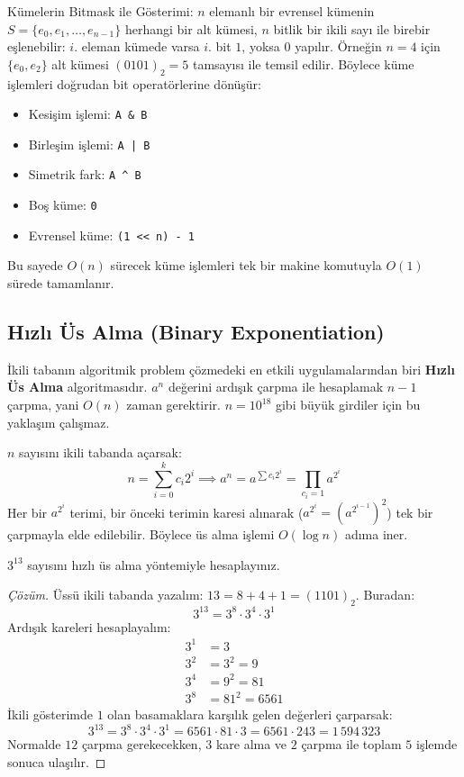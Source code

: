 Kümelerin Bitmask ile Gösterimi:
$n$ elemanlı bir evrensel kümenin $S = \{e_0, e_1, \dots, e_{n-1}\}$ herhangi bir alt kümesi, $n$ bitlik bir ikili sayı ile birebir eşlenebilir:
$i$. eleman kümede varsa $i$. bit $1$, yoksa $0$ yapılır.
Örneğin $n=4$ için $\{e_0, e_2\}$ alt kümesi $(0101)_2 = 5$ tamsayısı ile temsil edilir.
Böylece küme işlemleri doğrudan bit operatörlerine dönüşür:
\begin{itemize}
    \item Kesişim işlemi: \texttt{A \& B}
    \item Birleşim işlemi: \texttt{A | B}
    \item Simetrik fark: \texttt{A \textasciicircum{} B}
    \item Boş küme: \texttt{0}
    \item Evrensel küme: \texttt{(1 << n) - 1}
\end{itemize}

Bu sayede $O(n)$ sürecek küme işlemleri tek bir makine komutuyla $O(1)$ sürede tamamlanır.

\subsection{Hızlı Üs Alma (Binary Exponentiation)}

İkili tabanın algoritmik problem çözmedeki en etkili uygulamalarından biri \textbf{Hızlı Üs Alma} algoritmasıdır. $a^n$ değerini ardışık çarpma ile hesaplamak $n-1$ çarpma, yani $O(n)$ zaman gerektirir. $n = 10^{18}$ gibi büyük girdiler için bu yaklaşım çalışmaz.

$n$ sayısını ikili tabanda açarsak:
\[
n = \sum_{i=0}^k c_i 2^i \implies a^n = a^{\sum c_i 2^i} = \prod_{c_i = 1} a^{2^i}
\]
Her bir $a^{2^i}$ terimi, bir önceki terimin karesi alınarak ($a^{2^{i}} = (a^{2^{i-1}})^2$) tek bir çarpmayla elde edilebilir. Böylece üs alma işlemi $O(\log n)$ adıma iner.

\begin{example}
$3^{13}$ sayısını hızlı üs alma yöntemiyle hesaplayınız.
\end{example}

\begin{proof}[Çözüm]
Üssü ikili tabanda yazalım: $13 = 8 + 4 + 1 = (1101)_2$. Buradan:
\[
3^{13} = 3^8 \cdot 3^4 \cdot 3^1
\]
Ardışık kareleri hesaplayalım:
\begin{align*}
3^1 &= 3 \\
3^2 &= 3^2 = 9 \\
3^4 &= 9^2 = 81 \\
3^8 &= 81^2 = 6561
\end{align*}
İkili gösterimde $1$ olan basamaklara karşılık gelen değerleri çarparsak:
\[
3^{13} = 3^8 \cdot 3^4 \cdot 3^1 = 6561 \cdot 81 \cdot 3 = 6561 \cdot 243 = 1\,594\,323
\]
Normalde $12$ çarpma gerekecekken, $3$ kare alma ve $2$ çarpma ile toplam $5$ işlemde sonuca ulaşılır.
\end{proof}

